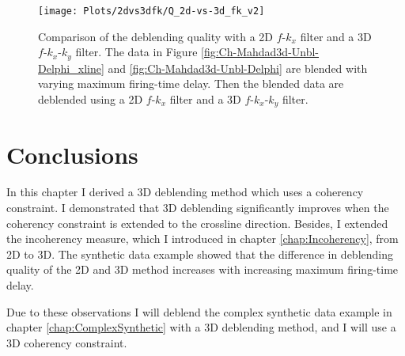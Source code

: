 \begin{figure}
	\centering
	\texttt{[image: Plots/2dvs3dfk/Q\_2d-vs-3d\_fk\_v2]}
	\caption{Comparison of the deblending quality with a 2D $f$-$k_x$ filter and a 3D $f$-$k_x$-$k_y$ filter. The data in Figure \ref{fig:Ch-Mahdad3d-Unbl-Delphi_xline} and \ref{fig:Ch-Mahdad3d-Unbl-Delphi} are blended with varying maximum firing-time delay. Then the blended data are deblended using a 2D $f$-$k_x$ filter and a 3D $f$-$k_x$-$k_y$ filter.}
	\label{fig:Ch-Mahdad3d-2dvs3dfk}
\end{figure}

\FloatBarrier


\section{Conclusions}

In this chapter I derived a 3D deblending method which uses a coherency constraint. I demonstrated that 3D deblending significantly improves when the coherency constraint is extended to the crossline direction. Besides, I extended the incoherency measure, which I introduced in chapter \ref{chap:Incoherency}, from 2D to 3D. The synthetic data example showed that the difference in deblending quality of the 2D and 3D method increases with increasing maximum firing-time delay.  

Due to these observations I will deblend the complex synthetic data example in chapter \ref{chap:ComplexSynthetic} with a 3D deblending method, and I will use a 3D coherency constraint.



















